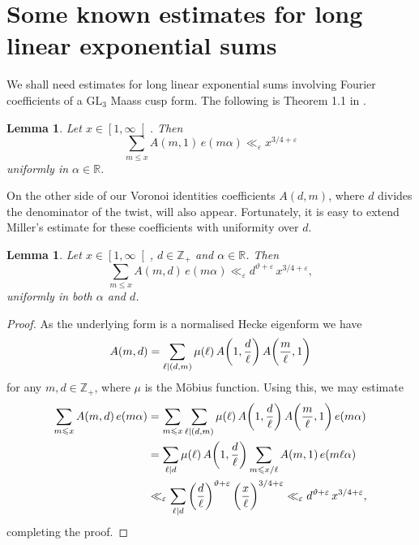 \documentclass[a4paper,10pt,twoside]{amsart}
\newtheorem{lemma}[theorem]{Lemma}
\theoremstyle{definition}
\numberwithin{equation}{section}
\newcommand\eps{\varepsilon}
\renewcommand\:{\colon}
\begin{document}
\section{Some known estimates for long linear exponential sums}

\noindent We shall need estimates for long linear exponential sums involving Fourier coefficients of a $\mathrm{GL}_3$ Maass cusp form. The following is Theorem 1.1 in \cite{Miller}.
\begin{lemma}\label{millers-bound}
Let $x\in\left[1,\infty\right[$. Then
\[\sum_{m\leqslant x}A(m,1)\,e(m\alpha)\ll_\eps x^{3/4+\varepsilon}\]
uniformly in $\alpha\in\mathbb R$.
\end{lemma}
\noindent On the other side of our Voronoi identities coefficients $A(d,m)$, where $d$ divides the denominator of the twist, will also appear. Fortunately, it is easy to extend Miller's estimate for these coefficients with uniformity over $d$.
\begin{lemma}\label{miller-improved}
Let $x\in\left[1,\infty\right[$, $d\in\mathbb Z_+$ and $\alpha\in\mathbb R$. Then
\[\sum_{m\leqslant x}A(m,d)\,e(m\alpha)\ll_\eps d^{\vartheta+\varepsilon}\,x^{3/4+\varepsilon},\]
uniformly in both $\alpha$ and $d$.
\end{lemma}

\begin{proof}
As the underlying form is a normalised Hecke eigenform we have
\[A(m,d)=\sum_{\ell\mid\left(d,m\right)}\mu\!\left(\ell\right)A\!\left(1,\frac d\ell\right)A\!\left(\frac{m\vphantom d}\ell,1\right)\]
for any $m,d\in\mathbb Z_+$, where $\mu$ is the M\"obius function. Using this, we may estimate
\begin{align*}
\sum_{m\leqslant x}A(m,d)\,e(m\alpha)
&=\sum_{m\leqslant x}\sum_{\ell\mid\left(d,m\right)}\mu\!\left(\ell\right)A\!\left(1,\frac d\ell\right)A\!\left(\frac{m\vphantom d}\ell,1\right)e(m\alpha)\\
&=\sum_{\ell\mid d}\mu\!\left(\ell\right)A\!\left(1,\frac d\ell\right)
\sum_{m\leqslant x/\ell}A(m,1)\,e\!\left(m\ell\alpha\right)\\
&\ll_\varepsilon\sum_{\ell\mid d}\left(\frac d\ell\right)^{\vartheta+\varepsilon}\left(\frac{x\vphantom d}\ell\right)^{3/4+\varepsilon}
\ll_\eps d^{\vartheta+\varepsilon}\,x^{3/4+\varepsilon},
\end{align*}
completing the proof. 
\end{proof}
\end{document}

